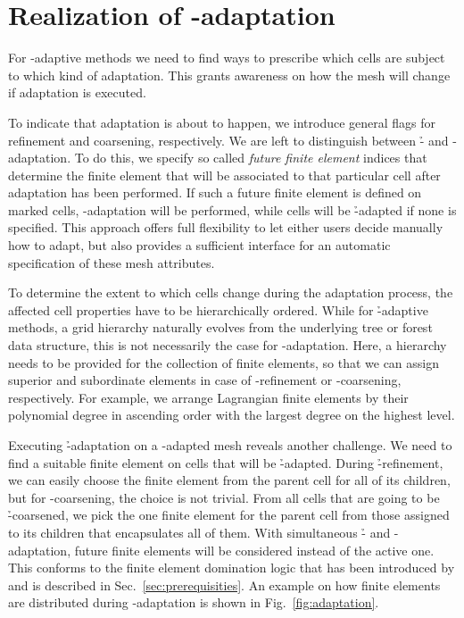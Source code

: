 \section{Realization of \hp-adaptation}
\label{sec:adaptation}

For \hp{}-adaptive methods we need to find ways to prescribe which cells are subject to which kind of adaptation. This grants awareness on how the mesh will change if adaptation is executed.

To indicate that adaptation is about to happen, we introduce general flags for refinement and coarsening, respectively. We are left to distinguish between \h- and \p-adaptation. To do this, we specify so called \textit{future finite element} indices that determine the finite element that will be associated to that particular cell after adaptation has been performed. If such a future finite element is defined on marked cells, \p-adaptation will be performed, while cells will be \h-adapted if none is specified. This approach offers full flexibility to let either users decide manually how to adapt, but also provides a sufficient interface for an automatic specification of these mesh attributes.

To determine the extent to which cells change during the adaptation process, the affected cell properties have to be hierarchically ordered. While for \h-adaptive methods, a grid hierarchy naturally evolves from the underlying tree or forest data structure, this is not necessarily the case for \p-adaptation. Here, a hierarchy needs to be provided for the collection of finite elements, so that we can assign superior and subordinate elements in case of \p-refinement or \p-coarsening, respectively. For example, we arrange Lagrangian finite elements by their polynomial degree in ascending order with the largest degree on the highest level.

Executing \h-adaptation on a \p-adapted mesh reveals another challenge. We need to find a suitable finite element on cells that will be \h-adapted. During \h-refinement, we can easily choose the finite element from the parent cell for all of its children, but for \p-coarsening, the choice is not trivial. From all cells that are going to be \h-coarsened, we pick the one finite element for the parent cell from those assigned to its children that encapsulates all of them. With simultaneous \h- and \p-adaptation, future finite elements will be considered instead of the active one. This conforms to the finite element domination logic that has been introduced by \textcite{bangerth2009} and is described in Sec.~\ref{sec:prerequisities}. An example on how finite elements are distributed during \hp-adaptation is shown in Fig.~\ref{fig:adaptation}.

